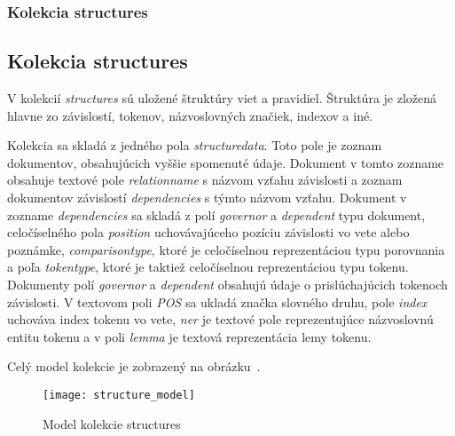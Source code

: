 %
%
{
	\subsubsection{Kolekcia structures}
}
{
	\subsection{Kolekcia structures}
}
\label{subsubsection:collection_structures}
V kolekcií \textit{structures} sú uložené štruktúry viet a pravidiel. Štruktúra je zložená hlavne zo závislostí, tokenov, názvoslovných značiek, indexov a iné.

Kolekcia sa skladá z jedného pola \textit{structure\textunderscore data}. Toto pole je zoznam dokumentov, obsahujúcich vyššie spomenuté údaje. Dokument v tomto zozname obsahuje textové pole \textit{relation\textunderscore name} s názvom vzťahu závislosti a zoznam dokumentov závislostí \textit{dependencies} s týmto názvom vzťahu. Dokument v zozname \textit{dependencies} sa skladá z polí \textit{governor} a \textit{dependent} typu dokument, celočíselného pola \textit{position} uchovávajúceho pozíciu závislosti vo vete alebo poznámke, \textit{comparison\textunderscore type}, ktoré je celočíselnou reprezentáciou typu porovnania a poľa \textit{token\textunderscore type}, ktoré je taktiež celočíselnou reprezentáciou typu tokenu. Dokumenty polí \textit{governor} a \textit{dependent} obsahujú údaje o prislúchajúcich tokenoch závislosti. V textovom poli \textit{POS} sa ukladá značka slovného druhu, pole \textit{index} uchováva index tokenu vo vete, \textit{ner} je textové pole reprezentujúce názvoslovnú entitu tokenu a v poli \textit{lemma} je textová reprezentácia lemy tokenu.

Celý model kolekcie je zobrazený na obrázku~.

\begin{figure}[H]
	\begin{center}\texttt{[image: structure\_model]}\end{center}
	\caption[Model kolekcie structures]{Model kolekcie structures}\label{fig:structures_collection_model}
\end{figure}

